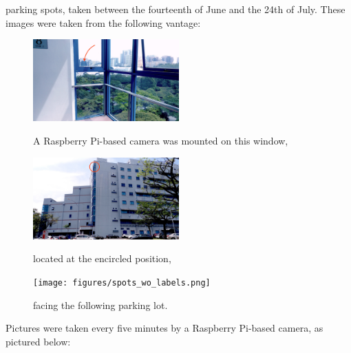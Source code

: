 \documentclass[a4paper, 11pt]{article} %
\begin{document}
	parking spots, taken between the fourteenth of June and the 24th of July. These images were taken 
	from the following vantage:
	\vskip 5mm
	\begin{figure}[H]
		\centering
		\includegraphics[width=0.5\textwidth]{figures/context_1.jpg}
		\caption{A Raspberry Pi-based camera was mounted on this window,}
		\vskip 5mm
		\includegraphics[width=0.5\textwidth]{figures/context_2.jpg}
		\caption{located at the encircled position,}
		\vskip 5mm
		\texttt{[image: figures/spots\_wo\_labels.png]}
		\caption{facing the following parking lot.}
	\end{figure}
	Pictures were taken every five minutes by a Raspberry Pi-based camera, as pictured below:
	\vskip 5mm
\end{document}
